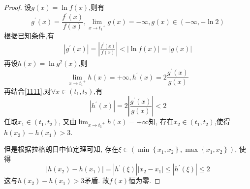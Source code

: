 \documentclass[lang=cn,newtx,10pt,scheme=chinese]{elegantbook}
\begin{document}
\begin{proof}
    设$g(x)=\ln f(x)$,则有
    \begin{equation}
      g^{\prime}(x)=\frac{f^{\prime}(x)}{f(x)}
      ,\lim_{x\rightarrow {t_1}^{+}} g\left( x \right) =-\infty ,g\left( x \right) \in \left( -\infty ,-\ln 2 \right) 
      \nonumber
    \end{equation}
    根据已知条件,有
    \begin{equation}\label{1111}
      \begin{split}
        \left| g^{\prime}\left( x \right) \right|=\left| \frac{f^{\prime}\left( x \right)}{f\left( x \right)} \right|<\left| \ln f\left( x \right) \right|=\left| g\left( x \right) \right|
      \end{split}
    \end{equation}
    再设$h(x)=\ln g^2(x)$,则
    \begin{equation}
      \lim_{x\rightarrow {t_1}^{+}} h\left( x \right) =+\infty
      ,h^{\prime}(x)=2\frac{g^{\prime}(x)}{g(x)}
      \nonumber
    \end{equation}
    再结合\eqref{1111},对$\forall x\in(t_1,t_2)$,有
    \begin{equation}
      \left| h^{\prime}(x) \right|=2\left| \frac{g^{\prime}(x)}{g(x)} \right|<2
      \nonumber
    \end{equation}
    任取$x_1\in(t_1,t_2)$,
    又由$\lim_{x\rightarrow {t_1}^{+}} h\left( x \right) =+\infty$知,
    存在$x_2\in (t_1,t_2)$,使得$h(x_2)-h(x_1)>3$.

    但是根据拉格朗日中值定理可知,
    存在$\xi \in \left( \min \left\{ x_1,x_2 \right\} ,\max \left\{ x_1,x_2 \right\} \right)$,
    使得
    \begin{equation}
      \left| h\left( x_2 \right) -h\left( x_1 \right) \right|=\left| h^{\prime}\left( \xi \right) \right|\left| x_2-x_1 \right|\le \left| h^{\prime}\left( \xi \right) \right|\le 2
      \nonumber
    \end{equation}
    这与$h(x_2)-h(x_1)>3$矛盾.
    故$f(x)$恒为零.
\end{proof}
\end{document}
